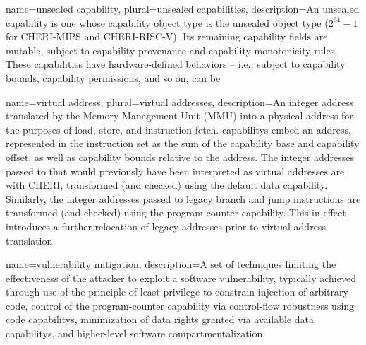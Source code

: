 {
  name=unsealed capability,
  plural=unsealed capabilities,
  description={An unsealed \gls{capability} is one whose \gls{capability object type}
    is the unsealed object type ($2^{64}-1$ for \gls{CHERI-MIPS} and \gls{CHERI-RISC-V}).
    Its remaining capability fields are mutable, subject to \gls{capability
    provenance} and \gls{capability monotonicity} rules.
    These capabilities have hardware-defined behaviors -- i.e., subject to
    \gls{capability bounds}, \gls{capability permissions}, and so on,
    can be }
}

{
  name=virtual address,
  plural=virtual addresses,
  description={An integer \gls{address} translated by the Memory Management
    Unit (MMU) into a \gls{physical address} for the purposes of load, store,
    and instruction fetch.
    \Glspl{capability} embed an address, represented in the instruction
    set as the sum of the \gls{capability base} and \gls{capability offset},
    as well as \gls{capability bounds} relative to the address.
    The integer addresses passed to  that would previously have been interpreted as
    virtual addresses are, with CHERI, transformed (and checked) using the
    \gls{default data capability}.
    Similarly, the integer addresses passed to legacy branch and jump
    instructions are transformed (and checked) using the \gls{program-counter
    capability}.
    This in effect introduces a further relocation of legacy addresses prior
    to virtual address translation}
}

{
  name=vulnerability mitigation,
  description={A set of techniques limiting the effectiveness of the attacker
    to exploit a software vulnerability, typically achieved through use of
    the \gls{principle of least privilege} to constrain injection of
    arbitrary code, control of the \gls{program-counter capability} via
    \gls{control-flow robustness} using \glspl{code capability}, minimization of
    data rights granted via available \glspl{data capability}, and higher-level
    \gls{software compartmentalization}}
}
